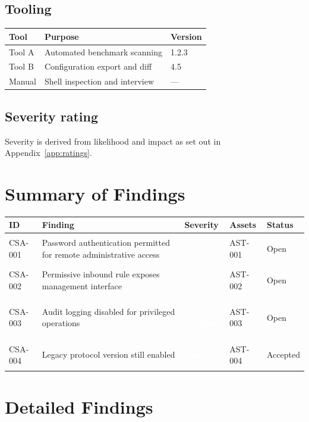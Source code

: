 \documentclass[11pt,a4paper]{article}
\newcommand{\setseverity}[1]{%
  \ifstrequal{#1}{Critical}{\colorlet{findcolor}{sevCritical}}{%
  \ifstrequal{#1}{High}{\colorlet{findcolor}{sevHigh}}{%
  \ifstrequal{#1}{Medium}{\colorlet{findcolor}{sevMedium}}{%
  \ifstrequal{#1}{Low}{\colorlet{findcolor}{sevLow}}{%
  \colorlet{findcolor}{sevInfo}}}}}}
\newcommand{\sev}[1]{\setseverity{#1}%
  \textcolor{white}{\colorbox{findcolor}{\strut\footnotesize\bfseries\,#1\,}}}
\begin{document}
\subsection{Tooling}
\begin{longtable}{@{}l p{6.5cm} l@{}}
\toprule
\textbf{Tool} & \textbf{Purpose} & \textbf{Version} \\
\midrule\endhead
Tool A & Automated benchmark scanning & 1.2.3 \\
Tool B & Configuration export and diff & 4.5 \\
Manual & Shell inspection and interview & --- \\
\bottomrule
\end{longtable}

\subsection{Severity rating}
Severity is derived from likelihood and impact as set out in Appendix~\ref{app:ratings}.

\section{Summary of Findings}
\begin{longtable}{@{}l p{6.2cm} l l l@{}}
\toprule
\textbf{ID} & \textbf{Finding} & \textbf{Severity} & \textbf{Assets} & \textbf{Status} \\
\midrule\endhead
\rowcolor{lightrow}
CSA-001 & Password authentication permitted for remote administrative access & \sev{Critical} & AST-001 & Open \\
CSA-002 & Permissive inbound rule exposes management interface & \sev{High} & AST-002 & Open \\
CSA-003 & Audit logging disabled for privileged operations & \sev{Medium} & AST-003 & Open \\
CSA-004 & Legacy protocol version still enabled & \sev{Low} & AST-004 & Accepted \\
\bottomrule
\end{longtable}

\section{Detailed Findings}
\end{document}
